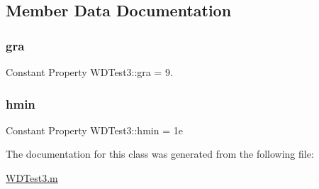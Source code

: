 \subsection{Member Data Documentation}
\mbox{\label{class_w_d_test3_a1feb9bef13924055a0570c5307dd0f10}} 
\subsubsection{\texorpdfstring{gra}{gra}}
{\footnotesize\ttfamily Constant Property W\+D\+Test3\+::gra = 9.}

\mbox{\label{class_w_d_test3_a38ccbba7402f3c17bd3785b293189a95}} 
\subsubsection{\texorpdfstring{hmin}{hmin}}
{\footnotesize\ttfamily Constant Property W\+D\+Test3\+::hmin = 1e}



The documentation for this class was generated from the following file\+:\begin{DoxyCompactItemize}
\item 
\hyperlink{_w_d_test3_8m}{W\+D\+Test3.\+m}\end{DoxyCompactItemize}
